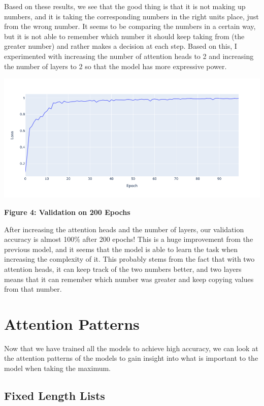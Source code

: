 \documentclass{article}
\begin{document}
Based on these results, we see that the good thing is that it is not making up numbers, and it is taking the corresponding numbers in the right units place, just from the wrong number. It seems to be comparing the numbers in a certain way, but it is not able to remember which number it should keep taking from (the greater number) and rather makes a decision at each step. Based on this, I experimented with increasing the number of attention heads to 2 and increasing the number of layers to 2 so that the model has more expressive power. 

\begin{center}
    \includegraphics[scale=0.4]{encoding_more_heads.png}

    \textbf{Figure 4: Validation on 200 Epochs}
\end{center}

After increasing the attention heads and the number of layers, our validation accuracy is almost 100$\%$ after 200 epochs! This is a huge improvement from the previous model, and it seems that the model is able to learn the task when increasing the complexity of it. This probably stems from the fact that with two attention heads, it can keep track of the two numbers better, and two layers means that it can remember which number was greater and keep copying values from that number. 

\section{Attention Patterns}

Now that we have trained all the models to achieve high accuracy, we can look at the attention patterns of the models to gain insight into what is important to the model when taking the maximum. 

\subsection{Fixed Length Lists}
\end{document}
